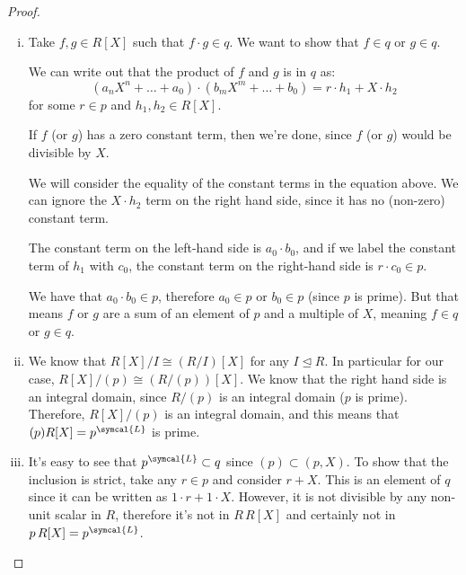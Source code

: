 \begin{proof}\hfill
\begin{enumerate}[(i)]
    \item Take \(f, g \in R[X]\) such that \(f \cdot g \in q\). We want to show that \(f \in q\) or \(g \in q\).
    
    We can write out that the product of \(f\) and \(g\) is in \(q\) as:
    \[
        (a_n X^n + \dots + a_0) \cdot (b_m X^m + \dots + b_0) = r \cdot h_1 + X \cdot h_2
    \]
    for some \(r \in p\) and \(h_1, h_2 \in R[X]\).
    
    If \(f\) (or \(g\)) has a zero constant term, then we're done, since \(f\) (or \(g\)) would be divisible by \(X\).
    
    We will consider the equality of the constant terms in the equation above. We can ignore the \(X \cdot h_2\) term on the right hand side, since it has no (non-zero) constant term.
    
    The constant term on the left-hand side is \(a_0 \cdot b_0\), and if we label the constant term of \(h_1\) with \(c_0\), the constant term on the right-hand side is \(r \cdot c_0 \in p\).
    
    We have that \(a_0 \cdot b_0 \in p\), therefore \(a_0 \in p\) or \(b_0 \in p\) (since \(p\) is prime). But that means \(f\) or \(g\) are a sum of an element of \(p\) and a multiple of \(X\), meaning \(f \in q\) or \(g \in q\).
    
    \item We know that \(R[X]/I \cong (R/I)[X]\) for any \(I \trianglelefteq R\). In particular for our case, \(R[X]/(p) \cong (R/(p))[X]\). We know that the right hand side is an integral domain, since \(R / (p)\) is an integral domain (\(p\) is prime). Therefore, \(R[X]/(p)\) is an integral domain, and this means that \((p)R[X] = p^{\symcal{L}}\) is prime.
    
    \item It's easy to see that \(p^{\symcal{L}} \subset q\) since \((p) \subset (p, X)\). To show that the inclusion is strict, take any \(r \in p\) and consider \(r + X\). This is an element of \(q\) since it can be written as \(1 \cdot r + 1 \cdot X\). However, it is not divisible by any non-unit scalar in \(R\), therefore it's not in \(R \, R[X]\) and certainly not in \(p \, R[X] = p^{\symcal{L}}\).
\end{enumerate}
\end{proof}
